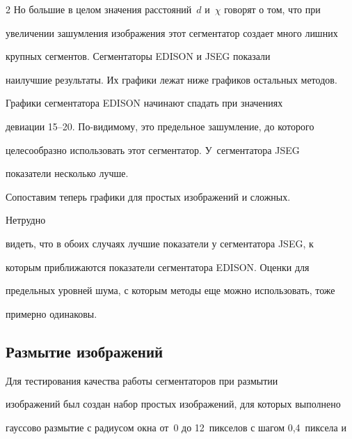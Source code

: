 \begin{multicols}{2}
Но большие в целом значения расстояний~$d$ и~$\chi$ говорят о том, что при 


увеличении зашумления изображения этот сегментатор создает много лишних 


крупных сегментов. Сегментаторы {EDISON} и {JSEG} показали 


наилучшие результаты. Их графики лежат ниже графиков остальных методов. 


Графики сегментатора {EDISON} начинают спадать при значениях 


девиации 15--20. По-видимому, это предельное зашумление, до которого 


целесообразно использовать этот сегментатор. У~сегментатора {JSEG} 


показатели несколько лучше.


  


  Сопоставим теперь графики для простых изоб\-ра\-же\-ний и сложных. 




  Нетрудно 


видеть, что в обоих случаях лучшие показатели у сегментатора {JSEG}, к 


которым приближаются показатели сегментатора {EDISON}. Оценки для 


предельных уровней шума, с которым методы еще можно использовать, тоже 


примерно одинаковы.





\vspace*{-6pt}


  


  \subsection{Размытие изображений}


  


  \vspace*{-2pt}


  


  Для тестирования качества работы сегментаторов при размытии 


изображений был создан набор простых изображений, для которых выполнено 


гауссово размытие с радиусом окна от~0 до 12~пикселов с шагом 0,4~пиксела и 



\end{multicols}
